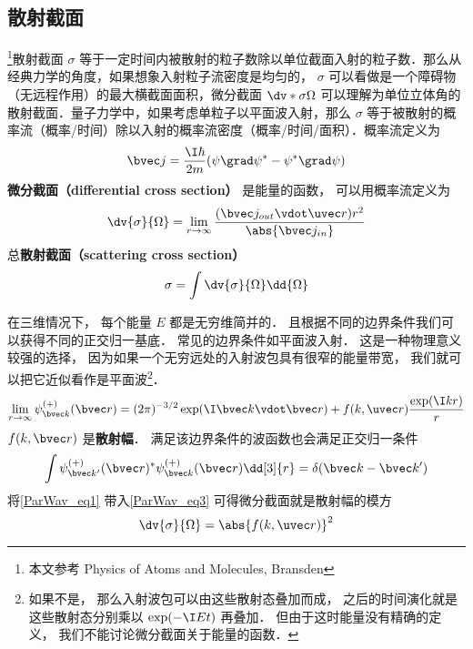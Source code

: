

\subsection{散射截面}

\footnote{本文参考 Physics of Atoms and Molecules, Bransden}散射截面 $\sigma$ 等于一定时间内被散射的粒子数除以单位截面入射的粒子数．那么从经典力学的角度，如果想象入射粒子流密度是均匀的， $\sigma$ 可以看做是一个障碍物（无远程作用）的最大横截面面积，微分截面 $\dv*{\sigma}{\Omega}$ 可以理解为单位立体角的散射截面．量子力学中，如果考虑单粒子以平面波入射，那么 $\sigma$ 等于被散射的概率流（概率/时间）除以入射的概率流密度（概率/时间/面积）．概率流定义为
\begin{equation}
\bvec j = \frac{\I\hbar }{2m}(\psi \grad \psi^* - \psi^* \grad \psi )
\end{equation}
\textbf{微分截面（differential cross section）} 是能量的函数， 可以用概率流定义为
\begin{equation}\label{ParWav_eq3}
\dv{\sigma}{\Omega} = \lim_{r\to\infty} \frac{(\bvec j_{out} \vdot \uvec r) r^2}{\abs{\bvec j_{in}}}
\end{equation}
总\textbf{散射截面（scattering cross section）}
\begin{equation}
\sigma = \int \dv{\sigma}{\Omega} \dd{\Omega} 
\end{equation}

在三维情况下， 每个能量 $E$ 都是无穷维简并的． 且根据不同的边界条件我们可以获得不同的正交归一基底． 常见的边界条件如平面波入射． 这是一种物理意义较强的选择， 因为如果一个无穷远处的入射波包具有很窄的能量带宽， 我们就可以把它近似看作是平面波\footnote{如果不是， 那么入射波包可以由这些散射态叠加而成， 之后的时间演化就是这些散射态分别乘以 $\exp(-\I E t)$ 再叠加． 但由于这时能量没有精确的定义， 我们不能讨论微分截面关于能量的函数．}．
\begin{equation}\label{ParWav_eq1}
\lim_{r \to \infty} \psi_{\bvec k}^{(+)}(\bvec r) = (2\pi)^{-3/2} \exp(\I \bvec k \vdot \bvec r) + f(k, \uvec r) \frac{\exp(\I k r)}{r}
\end{equation}
$f(k, \bvec r)$ 是\textbf{散射幅}． 满足该边界条件的波函数也会满足正交归一条件
\begin{equation}
\int \psi_{\bvec k'}^{(+)}(\bvec r)^* \psi_{\bvec k}^{(+)}(\bvec r) \dd[3]{r} = \delta(\bvec k - \bvec k')
\end{equation}
将\autoref{ParWav_eq1} 带入\autoref{ParWav_eq3} 可得微分截面就是散射幅的模方
\begin{equation}
\dv{\sigma}{\Omega} = \abs{f(k, \uvec r)}^2
\end{equation}

